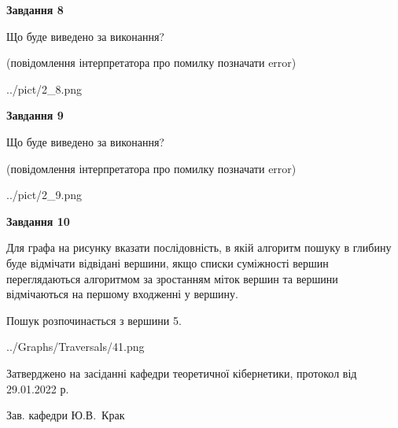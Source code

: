 \documentclass[12pt, ukrainian]{article}
\begin{document}
{\begin {large}
{\begin {center}\textbf{Завдання 8}\end {center}}\par
Що буде виведено за виконання?\par
 (повідомлення інтерпретатора про помилку позначати error)
\begin{center}
	{../pict/2_8.png}
\end{center}
\newpage

{\begin {center}\textbf{Завдання 9}\end {center}}\par
Що буде виведено за виконання?\par
 (повідомлення інтерпретатора про помилку позначати error)\par
\begin{center}
	{../pict/2_9.png}
\end{center}
\newpage

{\begin {center}\textbf{Завдання 10}\end {center}}\par
Для графа на рисунку вказати послідовність, в якій алгоритм пошуку в глибину буде відмічати відвідані вершини, якщо списки суміжності вершин переглядаються алгоритмом за зростанням міток вершин та вершини відмічаються на першому вход\-женні у вершину.\par
Пошук розпочинається з вершини 5.\par

\begin{center}
	{../Graphs/Traversals/41.png}
\end{center}\par
\newpage


\end {large}
}
{\smallskip \begin {small} Затверджено на засіданні кафедри теоретичної кібернетики, протокол  від   29.01.2022 р.\par\smallskip\smallskip
{\parbox {6.5 cm}{Зав. кафедри \dotfill Ю.В.~Крак}} \end{small}}
\end{document}
